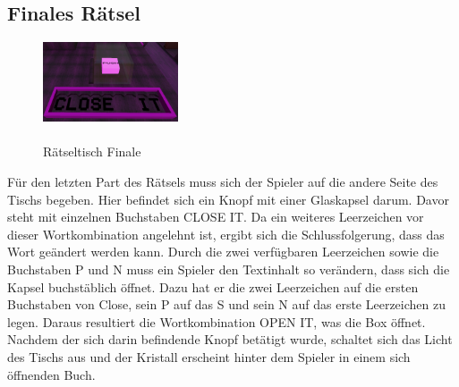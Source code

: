 \subsection{Finales Rätsel}
\begin{figure}
	\vspace*{-0.5cm}
	\includegraphics[width=4cm]{Pictures/Tisch4}
	\caption{\\ \noindent Rätseltisch Finale}
	\vspace*{-1.5cm}
	\label{fig:tisch4}
\end{figure}
Für den letzten Part des Rätsels muss sich der Spieler auf die andere Seite des Tischs begeben. Hier befindet sich ein Knopf mit einer Glaskapsel darum. Davor steht mit einzelnen Buchstaben \dq CLOSE  IT\dq. Da ein weiteres Leerzeichen vor dieser Wortkombination angelehnt ist, ergibt sich die Schlussfolgerung, dass das Wort geändert werden kann. Durch die zwei verfügbaren Leerzeichen sowie die Buchstaben P und N muss ein Spieler den Textinhalt so verändern, dass sich die Kapsel buchstäblich öffnet. Dazu hat er die zwei Leerzeichen auf die ersten Buchstaben von Close, sein P auf das S und sein N auf das erste Leerzeichen zu legen. Daraus resultiert die Wortkombination \dq OPEN IT\dq, was die Box öffnet. Nachdem der sich darin befindende Knopf betätigt wurde, schaltet sich das Licht des Tischs aus und der Kristall erscheint hinter dem Spieler in einem sich öffnenden Buch.
\noindent

